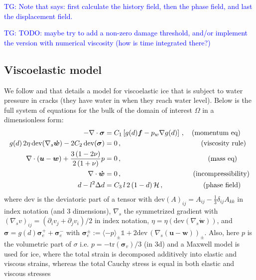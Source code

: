 \documentclass[11pt,a4paper]{article}
\newcommand{\p}{\partial}
\newcommand{\tg}[1]{\textcolor{blue}{TG: #1} }
\newcommand{\bb}[1]{\boldsymbol{#1}}
\newcommand{\dev}{\text{dev}}
\begin{document}
\tg{Note that \cite{Miehe2010} says: first calculate the history field, then the phase field, and last the displacement field.}

\tg{TODO: maybe try to add a non-zero damage threshold, and/or implement the version with numerical viscosity (how is time integrated there?)}

\subsection{Viscoelastic model}

We follow \cite{stocek2023} and that details a model for viscoelastic ice that is subject to water pressure in cracks (they have water in when they reach water level). Below is the full system of equations for the bulk of the domain of interest $\Omega$ in a dimensionless form:
\begin{subequations}
\begin{align}
    - \nabla \cdot \bb{\sigma}
    & = C_1 \left[ g(d) \bb{f} -p_w \nabla g(d) \right]
    \,,
    \quad \text{(momentum eq)}
    \label{eq:viscoelastic_full_eqs:momentum}
    \\
    g(d) \, 2 \eta \, \dev(\nabla_s \bb{\dot{w}}) - 2 C_2 \, \dev(\bb{\sigma})
    & = 0
    \,,
    \hspace{4cm} \text{(viscosity rule)}
    \label{eq:viscoelastic_full_eqs:viscosity_rule}
    \\
    \nabla \cdot \left(\bb{u}-\bb{w}\right) + \frac{3 \left(1-2\nu\right)}{2 \left(1 + \nu\right)} p
    & = 0
    \,,
    \hspace{4.35cm} \text{(mass eq)}
    \label{eq:viscoelastic_full_eqs:mass}
    \\
    \nabla \cdot \bb{\dot{w}}
    & = 0
    \,,
    \hspace{3.6cm}
    \text{(incompressibility)}
    \label{eq:viscoelastic_full_eqs:incompressibility}
    \\
    d - l^2 \Delta d 
    & = C_3 \, l \, 2 \left(1 - d \right) \mathcal{H}
    \,,
    \hspace{2cm}
    \text{(phase field)}
    \label{eq:viscoelastic_full_eqs:phase_field}
\end{align}
\label{eq:viscoelastic_full_eqs}
\end{subequations}
where $\dev$ is the deviatoric part of a tensor with $\dev(A)_{ij} = A_{ij} - \frac{1}{3} \delta_{ij} A_{kk}$ in index notation (and 3 dimensions), $\nabla_s$ the symmetrized gradient with $(\nabla_s v)_{ij} = (\p_i v_j + \p_j v_i)/2$ in index notation, $\eta=\eta(\dev(\nabla_s \bb{\dot{w}}))$, and $\bb{\sigma} = g(d) \bb{\sigma}_e^+ + \bb{\sigma}_e^-$ with $\bb{\sigma}_e^{\pm} := \langle -p \rangle_{\pm} \mathbb{1} + 2 \dev \, \left( \nabla_s(\bb{u-w})\right)_{\pm}$. Also, here $p$ is the volumetric part of $\sigma$ i.e. $p = - \text{tr}(\bb{\sigma}_v)/3$ (in 3d) and a Maxwell model is used for ice, where the total strain is decomposed additively into elastic and viscous strains, whereas the total Cauchy stress is equal in both elastic and viscous stresses
\end{document}
